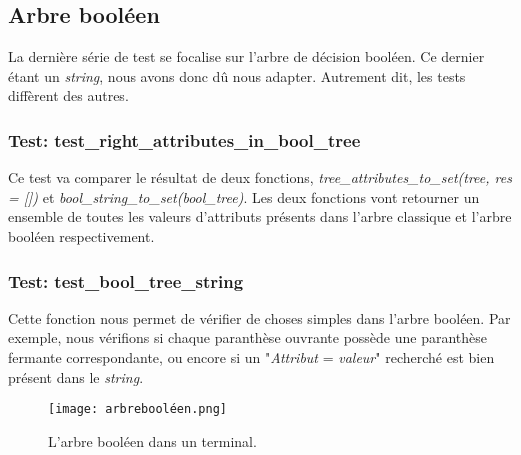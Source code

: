 \documentclass[utf8]{article}
\begin{document}
\subsection{Arbre booléen}
La dernière série de test se focalise sur l'arbre de décision booléen. Ce dernier étant un \emph{string}, nous avons donc dû nous adapter. Autrement dit, les tests diffèrent des autres.

\subsubsection{Test: test\_right\_attributes\_in\_bool\_tree}
Ce test va comparer le résultat de deux fonctions, \emph{tree\_attributes\_to\_set(tree, res = [])} et \emph{bool\_string\_to\_set(bool\_tree)}. Les deux fonctions vont retourner un ensemble de toutes les valeurs d'attributs présents
dans l'arbre classique et l'arbre booléen respectivement.

\subsubsection{Test: test\_bool\_tree\_string}
Cette fonction nous permet de vérifier de choses simples dans l'arbre booléen. Par exemple, nous vérifions si chaque paranthèse ouvrante possède une paranthèse fermante correspondante, ou encore si un "\emph{Attribut} = \emph{valeur}" recherché
est bien présent dans le \emph{string}.
\newline
\begin{figure}[h]
    \centering
    \texttt{[image: arbrebooléen.png]}
    \caption{L'arbre booléen dans un terminal.}
    \label{fig:image}
  \end{figure}
\end{document}
